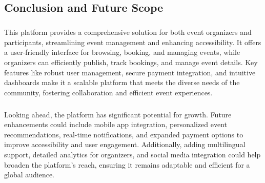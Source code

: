 \documentclass[twoside,a4paper,openright]{report} %
\begin{document}
\begin{flushleft}
	\chapter{Conclusion and Future Scope}
\end{flushleft}
\paragraph{}
\hspace{1.5cm}
\justify
This platform provides a comprehensive solution for both event organizers and participants, streamlining event management and enhancing accessibility. It offers a user-friendly interface for browsing, booking, and managing events, while organizers can efficiently publish, track bookings, and manage event details. Key features like robust user management, secure payment integration, and intuitive dashboards make it a scalable platform that meets the diverse needs of the community, fostering collaboration and efficient event experiences.

\paragraph{}
\hspace{1.5cm}
Looking ahead, the platform has significant potential for growth. Future enhancements could include mobile app integration, personalized event recommendations, real-time notifications, and expanded payment options to improve accessibility and user engagement. Additionally, adding multilingual support, detailed analytics for organizers, and social media integration could help broaden the platform’s reach, ensuring it remains adaptable and efficient for a global audience.












\newpage
\nocite{*}


\end{document}
